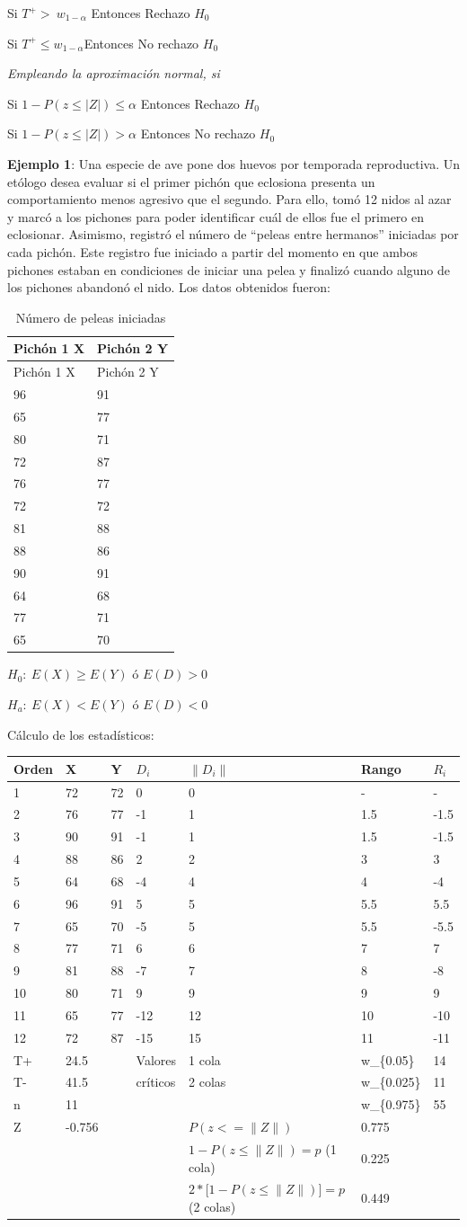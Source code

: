 \documentclass[]{book}
\theoremstyle{definition}
\theoremstyle{definition}
\theoremstyle{definition}
\theoremstyle{remark}
\begin{document}
Si \(T^{+} > \ w_{1 - \alpha}\) Entonces Rechazo \(H_{0}\)

Si \(T^{+}\leq w_{1 - \alpha}\)Entonces No rechazo \(H_{0}\)

\emph{Empleando la aproximación normal, si}

Si \(1 - P\left( z \leq \left| Z \right| \right) \leq \alpha\) Entonces
Rechazo \(H_{0}\)

Si \(1 - P\left( z \leq \left| Z \right| \right) > \alpha\) Entonces No
rechazo \(H_{0}\)

\textbf{Ejemplo 1}: Una especie de ave pone dos huevos por temporada
reproductiva. Un etólogo desea evaluar si el primer pichón que eclosiona
presenta un comportamiento menos agresivo que el segundo. Para ello,
tomó 12 nidos al azar y marcó a los pichones para poder identificar cuál
de ellos fue el primero en eclosionar. Asimismo, registró el número de
``peleas entre hermanos'' iniciadas por cada pichón. Este registro fue
iniciado a partir del momento en que ambos pichones estaban en
condiciones de iniciar una pelea y finalizó cuando alguno de los
pichones abandonó el nido. Los datos obtenidos fueron:

\begin{longtable}[]{@{}ll@{}}
\caption{\label{tab:peleas} Número de peleas iniciadas}\tabularnewline
\toprule
Pichón 1 X & Pichón 2 Y\tabularnewline
\midrule
\endfirsthead
\toprule
Pichón 1 X & Pichón 2 Y\tabularnewline
\midrule
\endhead
96 & 91\tabularnewline
65 & 77\tabularnewline
80 & 71\tabularnewline
72 & 87\tabularnewline
76 & 77\tabularnewline
72 & 72\tabularnewline
81 & 88\tabularnewline
88 & 86\tabularnewline
90 & 91\tabularnewline
64 & 68\tabularnewline
77 & 71\tabularnewline
65 & 70\tabularnewline
\bottomrule
\end{longtable}

\(H_{0}:\ E\left( X \right) \geq E(Y)\) ó \(E\left( D \right) > 0\)

\(H_{a}:\ E\left( X \right) < E(Y)\) ó \(E\left( D \right) < 0\)

Cálculo de los estadísticos:

\begin{longtable}[]{@{}lllllll@{}}
\toprule
Orden & X & Y & \(D_{i}\) & \(\|D_{i}\|\) & Rango &
\(R_{i}\)\tabularnewline
\midrule
\endhead
1 & 72 & 72 & 0 & 0 & - & -\tabularnewline
2 & 76 & 77 & -1 & 1 & 1.5 & -1.5\tabularnewline
3 & 90 & 91 & -1 & 1 & 1.5 & -1.5\tabularnewline
4 & 88 & 86 & 2 & 2 & 3 & 3\tabularnewline
5 & 64 & 68 & -4 & 4 & 4 & -4\tabularnewline
6 & 96 & 91 & 5 & 5 & 5.5 & 5.5\tabularnewline
7 & 65 & 70 & -5 & 5 & 5.5 & -5.5\tabularnewline
8 & 77 & 71 & 6 & 6 & 7 & 7\tabularnewline
9 & 81 & 88 & -7 & 7 & 8 & -8\tabularnewline
10 & 80 & 71 & 9 & 9 & 9 & 9\tabularnewline
11 & 65 & 77 & -12 & 12 & 10 & -10\tabularnewline
12 & 72 & 87 & -15 & 15 & 11 & -11\tabularnewline
T+ & 24.5 & & Valores & 1 cola & w\_\{0.05\} & 14\tabularnewline
T- & 41.5 & & críticos & 2 colas & w\_\{0.025\} & 11\tabularnewline
n & 11 & & & & w\_\{0.975\} & 55\tabularnewline
Z & -0.756 & & & \(P(z < = \|Z\|)\) & 0.775 &\tabularnewline
& & & & \(1 - P(z \leq \|Z\|) = p\) (1 cola) & 0.225 &\tabularnewline
& & & & \(2*\lbrack 1 - P(z \leq \|Z\|)\rbrack = p\) (2 colas) & 0.449
&\tabularnewline
\bottomrule
\end{longtable}
\end{document}
